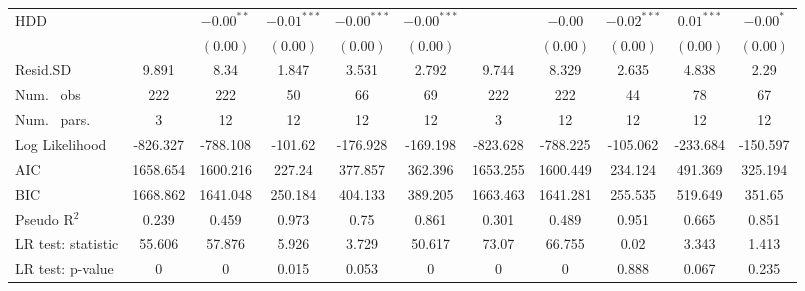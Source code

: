 \begin{table}
\begin{center}
\begin{tabular}{l c c c c c c c c c c}
HDD                               &               & $-0.00^{**}$  & $-0.01^{***}$ & $-0.00^{***}$ & $-0.00^{***}$  &               & $-0.00$       & $-0.02^{***}$ & $0.01^{***}$  & $-0.00^{*}$   \\
                                  &               & $(0.00)$      & $(0.00)$      & $(0.00)$      & $(0.00)$       &               & $(0.00)$      & $(0.00)$      & $(0.00)$      & $(0.00)$      \\
\hline
Resid.SD                          & 9.891         & 8.34          & 1.847         & 3.531         & 2.792          & 9.744         & 8.329         & 2.635         & 4.838         & 2.29          \\
Num. \ obs                        & 222           & 222           & 50            & 66            & 69             & 222           & 222           & 44            & 78            & 67            \\
Num. \ pars.                      & 3             & 12            & 12            & 12            & 12             & 3             & 12            & 12            & 12            & 12            \\
Log Likelihood                    & -826.327      & -788.108      & -101.62       & -176.928      & -169.198       & -823.628      & -788.225      & -105.062      & -233.684      & -150.597      \\
AIC                               & 1658.654      & 1600.216      & 227.24        & 377.857       & 362.396        & 1653.255      & 1600.449      & 234.124       & 491.369       & 325.194       \\
BIC                               & 1668.862      & 1641.048      & 250.184       & 404.133       & 389.205        & 1663.463      & 1641.281      & 255.535       & 519.649       & 351.65        \\
Pseudo R$^2$                      & 0.239         & 0.459         & 0.973         & 0.75          & 0.861          & 0.301         & 0.489         & 0.951         & 0.665         & 0.851         \\
LR test: statistic                & 55.606        & 57.876        & 5.926         & 3.729         & 50.617         & 73.07         & 66.755        & 0.02          & 3.343         & 1.413         \\
LR test: p-value                  & 0             & 0             & 0.015         & 0.053         & 0              & 0             & 0             & 0.888         & 0.067         & 0.235         \\

\end{tabular}
\end{center}
\end{table}
